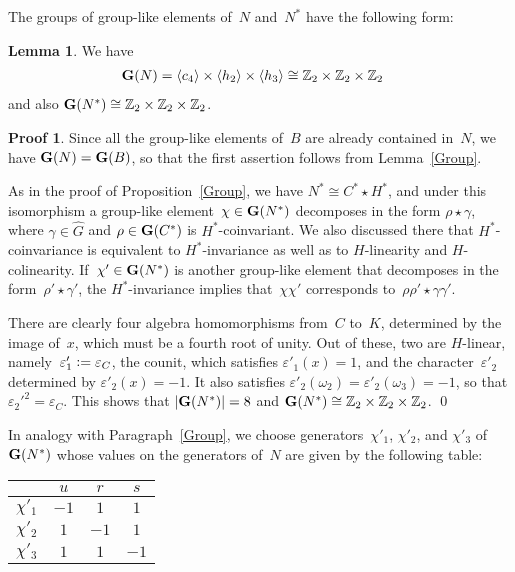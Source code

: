 \documentclass{article}
\numberwithin{equation}{section}
\theoremstyle{definition}
\newtheorem*{lem}{Lemma}
\newtheorem*{pf}{Proof}
\theoremstyle{break}
\newcommand{\deq}{\vcentcolon =}
\newcommand{\K}{1}
\newcommand{\1}{{(1)}}
\newcommand{\2}{{(2)}}
\newcommand{\3}{{(3)}}
\newcommand{\Z}{{\mathbb Z}}
\begin{document}
The groups of group-like elements of~$N$ and~$N^*$ have the following form:
\begin{lem}
We have
\begin{align*}
{\bf G}(N) &=  \left\langle c_4 \right\rangle \times \left\langle h_2 \right\rangle \times \left\langle h_3 \right\rangle\cong \Z_2 \times \Z_2 \times \Z_2
\end{align*}
and also ${\bf G}(N^*) \cong \Z_2 \times \Z_2 \times \Z_2$.
\end{lem}
\begin{pf}
Since all the group-like elements of~$B$ are already contained in~$N$, we have
${\bf G}(N) = {\bf G}(B)$, so that the first assertion follows from Lemma~\ref{Group}.

As in the proof of Proposition~\ref{Group}, we have $N^* \cong C^* \star H^*$, and under this isomorphism a group-like element~$\chi \in {\bf G}(N^*)$ decomposes in the form
$\rho \star \gamma$, where $\gamma \in \hat{G}$ and $\rho \in {\bf G}(C^*)$ is $H^*$-coinvariant. We also discussed there that $H^*$-coinvariance is equivalent to $H^*$-invariance as well as to $H$-linearity and \mbox{$H$-colinearity}. If~$\chi' \in {\bf G}(N^*)$ is another group-like element that decomposes in the form~$\rho' \star \gamma'$, the $H^*$-invariance implies that~$\chi \chi'$ corresponds to~$\rho \rho' \star \gamma \gamma'$.

There are clearly four algebra homomorphisms from~$C$ to~$K$, determined by the image of~$x$, which must be a fourth root of unity. Out of these, two are $H$-linear,
namely~$\varepsilon'_1 \deq \varepsilon_C$, the counit, which satisfies
$\varepsilon'_1(x) = \K$, and the character~$\varepsilon'_2$ determined by
$\varepsilon'_2(x) = -\K$. It also satisfies 
$\varepsilon'_2(\omega_2) = \varepsilon'_2(\omega_3) = -\K$, so that 
\mbox{$\varepsilon_2'^2 = \varepsilon_C$}. This shows that $|{\bf G}(N^*)|=8$ and
\mbox{${\bf G}(N^*) \cong \Z_2 \times \Z_2 \times \Z_2$}.
\qed
\end{pf}

In analogy with Paragraph~\ref{Group}, we choose generators~$\chi'_1$, $\chi'_2$, and $\chi'_3$ of~${\bf G}(N^*)$ whose values on the generators of~$N$ are given by the following table:
\begin{center}
\renewcommand\arraystretch{1.5}
\begin{tabular}{|c|c|c|c|} \hline
& $u$ & $r$ & $s$ \\ \hline
$\chi'_1$ & $-1$ & $1$ & $1$ \\ \hline
$\chi'_2$ & $1$ & $-1$ & $1$ \\ \hline
$\chi'_3$ & $1$ & $1$ & $-1$ \\ \hline
\end{tabular}
\end{center}
\end{document}
